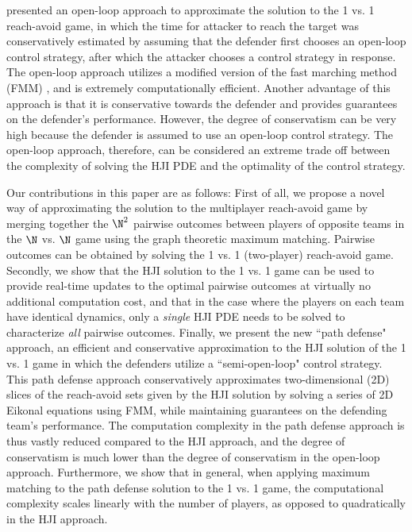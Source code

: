 \cite{Zhou2012} presented an open-loop approach to approximate the solution to the 1 vs. 1 reach-avoid game, in which the time for attacker to reach the target was conservatively estimated by assuming that the defender first chooses an open-loop control strategy, after which the attacker chooses a control strategy in response. The open-loop approach utilizes a modified version of the fast marching method (FMM) \cite{Sethian1996,Zhou2012}, and is extremely computationally efficient. Another advantage of this approach is that it is conservative towards the defender and provides guarantees on the defender's performance. However, the degree of conservatism can be very high because the defender is assumed to use an open-loop control strategy. The open-loop approach, therefore, can be considered an extreme trade off between the complexity of solving the HJI PDE and the optimality of the control strategy. 

Our contributions in this paper are as follows: First of all, we propose a novel way of approximating the solution to the multiplayer reach-avoid game by merging together the $\N^2$ pairwise outcomes between players of opposite teams in the $\N$ vs. $\N$ game using the graph theoretic maximum matching. Pairwise outcomes can be obtained by solving the 1 vs. 1 (two-player) reach-avoid game. Secondly, we show that the HJI solution to the 1 vs. 1 game can be used to provide real-time updates to the optimal pairwise outcomes at virtually no additional computation cost, and that in the case where the players on each team have identical dynamics, only a \textit{single} HJI PDE needs to be solved to characterize \textit{all} pairwise outcomes. Finally, we present the new ``path defense" approach, an efficient and conservative approximation to the HJI solution of the 1 vs. 1 game in which the defenders utilize a ``semi-open-loop" control strategy. This path defense approach conservatively approximates two-dimensional (2D) slices of the reach-avoid sets given by the HJI solution by solving a series of 2D Eikonal equations using FMM, while maintaining guarantees on the defending team's performance. The computation complexity in the path defense approach is thus vastly reduced compared to the HJI approach, and the degree of conservatism is much lower than the degree of conservatism in the open-loop approach. Furthermore, we show that in general, when applying maximum matching to the path defense solution to the 1 vs. 1 game, the computational complexity scales linearly with the number of players, as opposed to quadratically in the HJI approach.